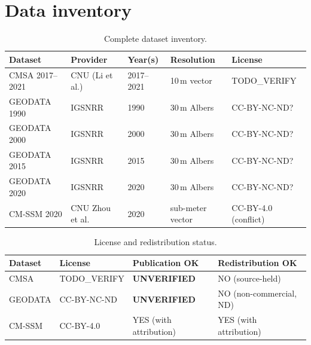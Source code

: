 \documentclass[11pt]{article}
\begin{document}
\appendix
\section{Data inventory}
\label{app:data}

\begin{table}[htpb]
\centering
\caption{\label{tab:data_inv}Complete dataset inventory.}
\begin{tabular}{l l l l l}
\toprule
Dataset & Provider & Year(s) & Resolution & License \\
\midrule
CMSA 2017--2021 & CNU (Li et al.) & 2017--2021 & 10\,m vector & TODO\_VERIFY \\
GEODATA 1990 & IGSNRR & 1990 & 30\,m Albers & CC-BY-NC-ND? \\
GEODATA 2000 & IGSNRR & 2000 & 30\,m Albers & CC-BY-NC-ND? \\
GEODATA 2015 & IGSNRR & 2015 & 30\,m Albers & CC-BY-NC-ND? \\
GEODATA 2020 & IGSNRR & 2020 & 30\,m Albers & CC-BY-NC-ND? \\
CM-SSM 2020 & CNU Zhou et al. & 2020 & sub-meter vector & CC-BY-4.0 (conflict) \\
\bottomrule
\end{tabular}
\end{table}

\begin{table}[htpb]
\centering
\caption{\label{tab:licenses}License and redistribution status.}
\begin{tabular}{l l l l}
\toprule
Dataset & License & Publication OK & Redistribution OK \\
\midrule
CMSA & TODO\_VERIFY & \textbf{UNVERIFIED} & NO (source-held) \\
GEODATA & CC-BY-NC-ND & \textbf{UNVERIFIED} & NO (non-commercial, ND) \\
CM-SSM & CC-BY-4.0 & YES (with attribution) & YES (with attribution) \\
\bottomrule
\end{tabular}
\end{table}

\end{document}
